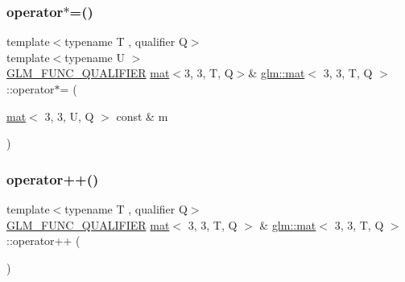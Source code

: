 \mbox{\label{structglm_1_1mat_3_013_00_013_00_01_t_00_01_q_01_4_a7c00c95a88f92ef9bf08db8a921c6e83}} 
\subsubsection{\texorpdfstring{operator$\ast$=()}{operator*=()}\hspace{0.1cm}{\footnotesize\ttfamily [4/4]}}
{\footnotesize\ttfamily template$<$typename T , qualifier Q$>$ \\
template$<$typename U $>$ \\
\mbox{\hyperlink{setup_8hpp_a33fdea6f91c5f834105f7415e2a64407}{G\+L\+M\+\_\+\+F\+U\+N\+C\+\_\+\+Q\+U\+A\+L\+I\+F\+I\+ER}} \mbox{\hyperlink{structglm_1_1mat}{mat}}$<$3, 3, T, Q$>$\& \mbox{\hyperlink{structglm_1_1mat}{glm\+::mat}}$<$ 3, 3, T, Q $>$\+::operator$\ast$= (\begin{DoxyParamCaption}\item[{\mbox{\hyperlink{structglm_1_1mat}{mat}}$<$ 3, 3, U, Q $>$ const \&}]{m }\end{DoxyParamCaption})}

\mbox{\label{structglm_1_1mat_3_013_00_013_00_01_t_00_01_q_01_4_ab04f2425cf74fb2edd7fdef18e9c2201}} 
\subsubsection{\texorpdfstring{operator++()}{operator++()}\hspace{0.1cm}{\footnotesize\ttfamily [1/2]}}
{\footnotesize\ttfamily template$<$typename T , qualifier Q$>$ \\
\mbox{\hyperlink{setup_8hpp_a33fdea6f91c5f834105f7415e2a64407}{G\+L\+M\+\_\+\+F\+U\+N\+C\+\_\+\+Q\+U\+A\+L\+I\+F\+I\+ER}} \mbox{\hyperlink{structglm_1_1mat}{mat}}$<$ 3, 3, T, Q $>$ \& \mbox{\hyperlink{structglm_1_1mat}{glm\+::mat}}$<$ 3, 3, T, Q $>$\+::operator++ (\begin{DoxyParamCaption}{ }\end{DoxyParamCaption})}

